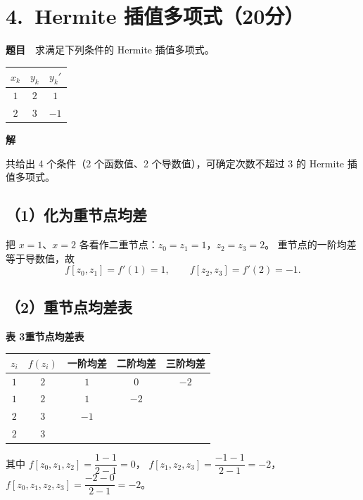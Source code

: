 \documentclass[a4paper,11pt]{ctexart}
\begin{document}
\section*{4.\ Hermite 插值多项式（20分）}

\textbf{题目}　求满足下列条件的 Hermite 插值多项式。
\begin{center}
  \begin{tabular}{ccc}
    \toprule
    $x_k$ & $y_k$ & $y_k'$ \\
    \midrule
    $1$ & $2$ & $1$  \\
    $2$ & $3$ & $-1$ \\
    \bottomrule
  \end{tabular}
\end{center}

\textbf{解}

共给出 4 个条件（2 个函数值、2 个导数值），可确定次数不超过 3 的 Hermite 插值多项式。

\subsection*{（1）化为重节点均差}
把 $x=1$、$x=2$ 各看作二重节点：$z_0=z_1=1$，$z_2=z_3=2$。
重节点的一阶均差等于导数值，故
\[
  f[z_0,z_1]=f'(1)=1,\qquad f[z_2,z_3]=f'(2)=-1 .
\]

\subsection*{（2）重节点均差表}
\begin{center}
  {\small\bfseries 表 3\quad 重节点均差表}\\[0.4em]
  \renewcommand{\arraystretch}{1.2}
  \begin{tabular}{ccccc}
    \toprule
    $z_i$ & $f(z_i)$ & 一阶均差 & 二阶均差 & 三阶均差 \\
    \midrule
    $1$ & $2$ & $1$   & $0$   & $-2$ \\
    $1$ & $2$ & $1$   & $-2$ &      \\
    $2$ & $3$ & $-1$ &      &      \\
    $2$ & $3$ &      &      &      \\
    \bottomrule
  \end{tabular}
\end{center}
{\small 其中 $f[z_0,z_1,z_2]=\dfrac{1-1}{2-1}=0$，
$f[z_1,z_2,z_3]=\dfrac{-1-1}{2-1}=-2$，
$f[z_0,z_1,z_2,z_3]=\dfrac{-2-0}{2-1}=-2$。}
\end{document}
